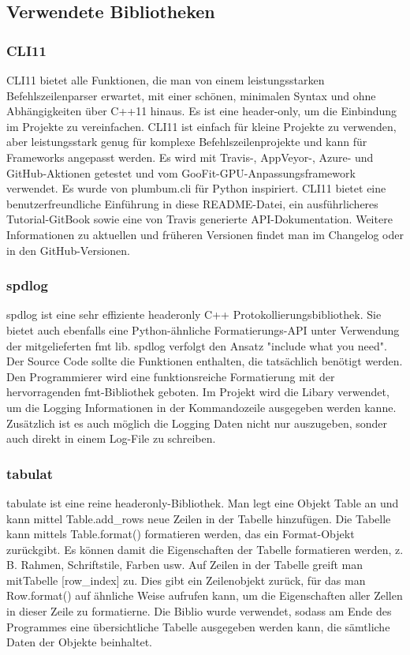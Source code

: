 \documentclass[a4paper,12pt]{article}
\begin{document}
\subsection{Verwendete Bibliotheken}
\subsubsection{CLI11}
CLI11 bietet alle Funktionen, die man von einem leistungsstarken Befehlszeilenparser erwartet, mit einer schönen, minimalen Syntax und ohne 
Abhängigkeiten über C++11 hinaus. Es ist eine header-only, um die Einbindung im Projekte zu 
vereinfachen. CLI11 ist einfach für kleine Projekte zu verwenden, aber leistungsstark genug für komplexe Befehlszeilenprojekte und kann für Frameworks angepasst werden. 
Es wird mit Travis-, AppVeyor-, Azure- und GitHub-Aktionen getestet und vom GooFit-GPU-Anpassungsframework verwendet. 
Es wurde von plumbum.cli für Python inspiriert. CLI11 bietet eine benutzerfreundliche Einführung in diese README-Datei, ein ausführlicheres Tutorial-GitBook sowie eine von Travis generierte API-Dokumentation. 
Weitere Informationen zu aktuellen und früheren Versionen findet man im Changelog oder in den GitHub-Versionen.
\subsubsection{spdlog}
spdlog ist eine sehr effiziente headeronly C++ Protokollierungsbibliothek. Sie bietet auch ebenfalls eine Python-ähnliche Formatierungs-API unter Verwendung der mitgelieferten fmt lib.
spdlog verfolgt den Ansatz "include what you need". Der Source Code sollte die Funktionen enthalten, die tatsächlich benötigt werden.
Den Programmierer wird eine funktionsreiche Formatierung mit der hervorragenden fmt-Bibliothek geboten.
Im Projekt wird die Libary verwendet, um die Logging Informationen in der Kommandozeile ausgegeben werden kanne. Zusätzlich ist es auch möglich
die Logging Daten nicht nur auszugeben, sonder auch direkt in einem Log-File zu schreiben.

\subsubsection{tabulat}
tabulate ist eine reine headeronly-Bibliothek. 
Man legt eine Objekt Table an und kann mittel Table.add\_rows neue Zeilen in der Tabelle hinzufügen.
Die Tabelle kann mittels Table.format() formatieren werden, das ein Format-Objekt zurückgibt. 
Es können damit die Eigenschaften der Tabelle formatieren werden, z. B. Rahmen, Schriftstile, Farben usw.
Auf Zeilen in der Tabelle greift man mitTabelle [row\_index] zu. Dies gibt ein Zeilenobjekt zurück, für das man Row.format() auf ähnliche Weise aufrufen kann, um die Eigenschaften aller Zellen in dieser Zeile zu formatierne.
Die Biblio wurde verwendet, sodass am Ende des Programmes eine übersichtliche Tabelle ausgegeben werden kann, die sämtliche Daten der Objekte
beinhaltet.
\end{document}
